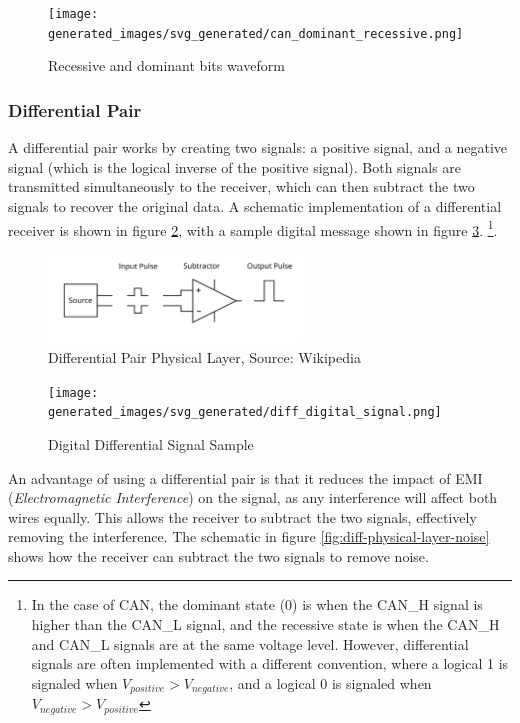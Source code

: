 \documentclass[main.tex]{subfiles}
\begin{document}
\begin{figure}[H]
    \centering
    \texttt{[image: generated\_images/svg\_generated/can\_dominant\_recessive.png]}
    \caption{Recessive and dominant bits waveform \cite{ti_can_signal_levels}}
    \label{fig:can-dominant-recessive}
\end{figure}

\subsubsection{Differential Pair} 
A differential pair works by creating two signals: a positive signal, and a negative signal (which is the logical inverse of the positive signal). Both signals are transmitted simultaneously to the receiver, which can then subtract the two signals to recover the original data. A schematic implementation of a differential receiver is shown in figure \ref{fig:diff-physical-layer}, with a sample digital message shown in figure \ref{fig:diff-digital-sample}. \footnote{In the case of CAN, the dominant state (0) is when the CAN\_H signal is higher than the CAN\_L signal, and the recessive state is when the CAN\_H and CAN\_L signals are at the same voltage level. However, differential signals are often implemented with a different convention, where a logical 1 is signaled when $V_{positive}  > V_{negative}$, and a logical 0 is signaled when $V_{negative} > V_{positive}$}.
\begin{figure}[H]
    \centering
    \includegraphics[width=0.6\textwidth]{images/wikipedia_diff_signal.png}
    \caption{Differential Pair Physical Layer, Source: Wikipedia \cite{wikipedia_differential_signalling}}
    \label{fig:diff-physical-layer}
\end{figure}
\begin{figure}[H]
    \centering
    \texttt{[image: generated\_images/svg\_generated/diff\_digital\_signal.png]}
    \caption{Digital Differential Signal Sample}
    \label{fig:diff-digital-sample}
\end{figure}

\noindent An advantage of using a differential pair is that it reduces the impact of EMI (\textit{Electromagnetic Interference}) on the signal, as any interference will affect both wires equally. This allows the receiver to subtract the two signals, effectively removing the interference. The schematic in figure \ref{fig:diff-physical-layer-noise} shows how the receiver can subtract the two signals to remove noise.
\end{document}
